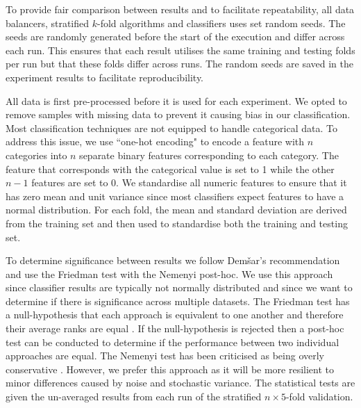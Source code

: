 \documentclass{sig-alternate-05-2015}
\begin{document}
	To provide fair comparison between results and to facilitate repeatability, all data balancers, stratified $k$-fold algorithms and classifiers uses set random seeds. The seeds are randomly generated before the start of the execution and differ across each run. This ensures that each result utilises the same training and testing folds per run but that these folds differ across runs. The random seeds are saved in the experiment results to facilitate reproducibility.
	
	All data is first pre-processed before it is used for each experiment. We opted to remove samples with missing data to prevent it causing bias in our classification. Most classification techniques are not equipped to handle categorical data. To address this issue, we use ``one-hot encoding" to encode a feature with $n$ categories into $n$ separate binary features corresponding to each category. The feature that corresponds with the categorical value is set to 1 while the other $n-1$ features are set to 0. We standardise all numeric features to ensure that it has zero mean and unit variance since most classifiers expect features to have a normal distribution. For each fold, the mean and standard deviation are derived from the training set and then used to standardise both the training and testing set. 
	
	To determine significance between results we follow Dem\v{s}ar's \cite{Demsar:2006:SCC:1248547.1248548} recommendation and use the Friedman test with the Nemenyi post-hoc. We use this approach since classifier results are typically not normally distributed and since we want to determine if there is significance across multiple datasets. The Friedman test has a null-hypothesis that each approach is equivalent to one another and therefore their average ranks are equal \cite{Demsar:2006:SCC:1248547.1248548}. If the null-hypothesis is rejected then a post-hoc test can be conducted to determine if the performance between two individual approaches are equal. The Nemenyi test has been criticised as being overly conservative \cite{garcia2008extension}. However, we prefer this approach as it will be more resilient to minor differences caused by noise and stochastic variance. The statistical tests are given the un-averaged results from each run of the stratified $n \times 5$-fold validation.
	
\end{document}
